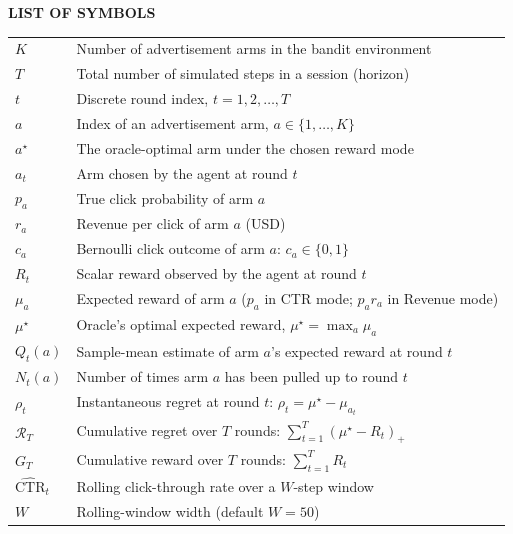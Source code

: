 \begin{center}{\Large\bfseries LIST OF SYMBOLS}\end{center}
\vspace{0.5em}

\renewcommand{\arraystretch}{1.35}
\begin{xltabular}{\linewidth}{@{}p{3.0cm} X@{}}
$K$                 & Number of advertisement arms in the bandit environment\\
$T$                 & Total number of simulated steps in a session (horizon)\\
$t$                 & Discrete round index, $t = 1, 2, \ldots, T$\\
$a$                 & Index of an advertisement arm, $a \in \{1, \ldots, K\}$\\
$a^\star$           & The oracle-optimal arm under the chosen reward mode\\
$a_t$               & Arm chosen by the agent at round $t$\\
$p_a$               & True click probability of arm $a$\\
$r_a$               & Revenue per click of arm $a$ (USD)\\
$c_a$               & Bernoulli click outcome of arm $a$: $c_a \in \{0, 1\}$\\
$R_t$               & Scalar reward observed by the agent at round $t$\\
$\mu_a$             & Expected reward of arm $a$ ($p_a$ in CTR mode; $p_a r_a$ in Revenue mode)\\
$\mu^\star$         & Oracle's optimal expected reward, $\mu^\star = \max_a \mu_a$\\
$Q_t(a)$            & Sample-mean estimate of arm $a$'s expected reward at round $t$\\
$N_t(a)$            & Number of times arm $a$ has been pulled up to round $t$\\
$\rho_t$            & Instantaneous regret at round $t$: $\rho_t = \mu^\star - \mu_{a_t}$\\
$\mathcal{R}_T$     & Cumulative regret over $T$ rounds: $\sum_{t=1}^{T} (\mu^\star - R_t)_+$\\
$G_T$               & Cumulative reward over $T$ rounds: $\sum_{t=1}^{T} R_t$\\
$\widehat{\text{CTR}}_t$ & Rolling click-through rate over a $W$-step window\\
$W$                 & Rolling-window width (default $W = 50$)\\

\end{xltabular}
